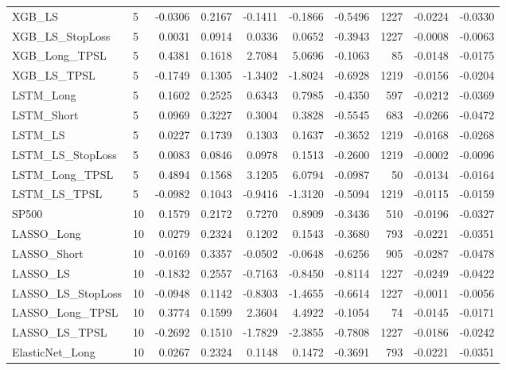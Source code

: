 \begin{tabular}{llrrrrrrrr}
\cline{1-10}
XGB\_LS & 5 & -0.0306 & 0.2167 & -0.1411 & -0.1866 & -0.5496 & 1227 & -0.0224 & -0.0330 \\
\cline{1-10}
XGB\_LS\_StopLoss & 5 & 0.0031 & 0.0914 & 0.0336 & 0.0652 & -0.3943 & 1227 & -0.0008 & -0.0063 \\
\cline{1-10}
XGB\_Long\_TPSL & 5 & 0.4381 & 0.1618 & 2.7084 & 5.0696 & -0.1063 & 85 & -0.0148 & -0.0175 \\
\cline{1-10}
XGB\_LS\_TPSL & 5 & -0.1749 & 0.1305 & -1.3402 & -1.8024 & -0.6928 & 1219 & -0.0156 & -0.0204 \\
\cline{1-10}
LSTM\_Long & 5 & 0.1602 & 0.2525 & 0.6343 & 0.7985 & -0.4350 & 597 & -0.0212 & -0.0369 \\
\cline{1-10}
LSTM\_Short & 5 & 0.0969 & 0.3227 & 0.3004 & 0.3828 & -0.5545 & 683 & -0.0266 & -0.0472 \\
\cline{1-10}
LSTM\_LS & 5 & 0.0227 & 0.1739 & 0.1303 & 0.1637 & -0.3652 & 1219 & -0.0168 & -0.0268 \\
\cline{1-10}
LSTM\_LS\_StopLoss & 5 & 0.0083 & 0.0846 & 0.0978 & 0.1513 & -0.2600 & 1219 & -0.0002 & -0.0096 \\
\cline{1-10}
LSTM\_Long\_TPSL & 5 & 0.4894 & 0.1568 & 3.1205 & 6.0794 & -0.0987 & 50 & -0.0134 & -0.0164 \\
\cline{1-10}
LSTM\_LS\_TPSL & 5 & -0.0982 & 0.1043 & -0.9416 & -1.3120 & -0.5094 & 1219 & -0.0115 & -0.0159 \\
\cline{1-10}
SP500 & 10 & 0.1579 & 0.2172 & 0.7270 & 0.8909 & -0.3436 & 510 & -0.0196 & -0.0327 \\
\cline{1-10}
LASSO\_Long & 10 & 0.0279 & 0.2324 & 0.1202 & 0.1543 & -0.3680 & 793 & -0.0221 & -0.0351 \\
\cline{1-10}
LASSO\_Short & 10 & -0.0169 & 0.3357 & -0.0502 & -0.0648 & -0.6256 & 905 & -0.0287 & -0.0478 \\
\cline{1-10}
LASSO\_LS & 10 & -0.1832 & 0.2557 & -0.7163 & -0.8450 & -0.8114 & 1227 & -0.0249 & -0.0422 \\
\cline{1-10}
LASSO\_LS\_StopLoss & 10 & -0.0948 & 0.1142 & -0.8303 & -1.4655 & -0.6614 & 1227 & -0.0011 & -0.0056 \\
\cline{1-10}
LASSO\_Long\_TPSL & 10 & 0.3774 & 0.1599 & 2.3604 & 4.4922 & -0.1054 & 74 & -0.0145 & -0.0171 \\
\cline{1-10}
LASSO\_LS\_TPSL & 10 & -0.2692 & 0.1510 & -1.7829 & -2.3855 & -0.7808 & 1227 & -0.0186 & -0.0242 \\
\cline{1-10}
ElasticNet\_Long & 10 & 0.0267 & 0.2324 & 0.1148 & 0.1472 & -0.3691 & 793 & -0.0221 & -0.0351 \\

\end{tabular}

